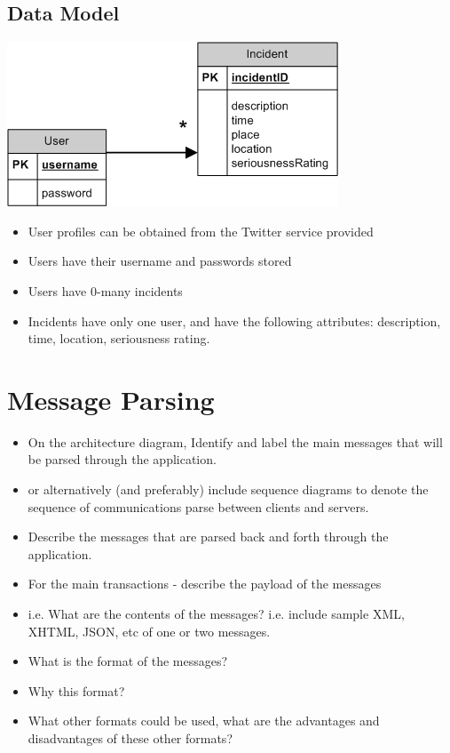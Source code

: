 \documentclass{sig-alt-release2}
\begin{document}
\subsection{Data Model}

\begin{center}
\includegraphics[scale=0.4]{img/4.png}
\end{center}

\begin{itemize}
\item    User profiles can be obtained from the Twitter service provided
\item    Users have their username and passwords stored
\item    Users have 0-many incidents
\item    Incidents have only one user, and have the following attributes: description, time, location, seriousness rating.
\end{itemize}


\section{Message Parsing}
\begin{itemize}

\item	On the architecture diagram, Identify and label the main messages that will be parsed through the application.
\item	or alternatively (and preferably) include sequence diagrams to denote the sequence of communications parse between clients and servers.
\item	Describe the messages that are parsed back and forth through the application.
\item	For the main transactions - describe the payload of the messages 
\item	i.e. What are the contents of the messages? i.e. include sample XML, XHTML, JSON, etc of one or two messages.
\item	What is the format of the messages? 
\item	Why this format? 
\item	What other formats could be used, what are the advantages and disadvantages of these other formats?
\end{itemize}
\end{document}

